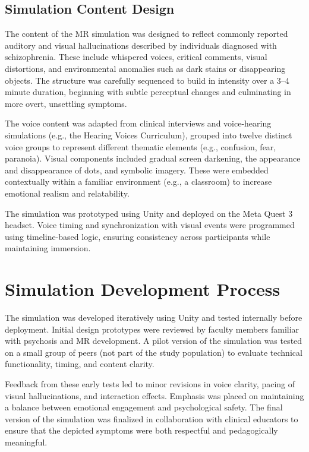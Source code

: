 \subsection{Simulation Content Design}

The content of the MR simulation was designed to reflect commonly reported auditory and visual hallucinations described by individuals diagnosed with schizophrenia. These include whispered voices, critical comments, visual distortions, and environmental anomalies such as dark stains or disappearing objects. The structure was carefully sequenced to build in intensity over a 3–4 minute duration, beginning with subtle perceptual changes and culminating in more overt, unsettling symptoms.

The voice content was adapted from clinical interviews and voice-hearing simulations (e.g., the Hearing Voices Curriculum), grouped into twelve distinct voice groups to represent different thematic elements (e.g., confusion, fear, paranoia). Visual components included gradual screen darkening, the appearance and disappearance of dots, and symbolic imagery. These were embedded contextually within a familiar environment (e.g., a classroom) to increase emotional realism and relatability.

The simulation was prototyped using Unity and deployed on the Meta Quest 3 headset. Voice timing and synchronization with visual events were programmed using timeline-based logic, ensuring consistency across participants while maintaining immersion.

\section{Simulation Development Process}

The simulation was developed iteratively using Unity and tested internally before deployment. Initial design prototypes were reviewed by faculty members familiar with psychosis and MR development. A pilot version of the simulation was tested on a small group of peers (not part of the study population) to evaluate technical functionality, timing, and content clarity.

Feedback from these early tests led to minor revisions in voice clarity, pacing of visual hallucinations, and interaction effects. Emphasis was placed on maintaining a balance between emotional engagement and psychological safety. The final version of the simulation was finalized in collaboration with clinical educators to ensure that the depicted symptoms were both respectful and pedagogically meaningful.


